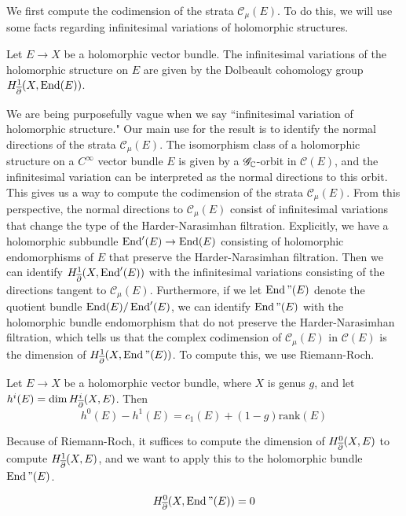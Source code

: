 We first compute the codimension of the strata $\mathscr{C}_\mu(E)$. To do
this, we will use some facts regarding infinitesimal variations of holomorphic
structures.
%
\begin{prop}
Let $E \to X$ be a holomorphic vector bundle. The infinitesimal variations
of the holomorphic structure on $E$ are given by the Dolbeault cohomology group
$H^1_{\overline{\partial}}(X, \operatorname{End}(E))$.
\end{prop}
%
We are being purposefully vague when we say ``infinitesimal variation of holomorphic
structure." Our main use for the result is to identify the normal directions
of the strata $\mathscr{C}_\mu(E)$. The isomorphism class of a holomorphic
structure on a $C^\infty$ vector bundle $E$ is given by a $\mathscr{G}_{\mathbb{C}}$-orbit
in $\mathscr{C}(E)$, and the infinitesimal variation can be interpreted as the
normal directions to this orbit. This gives us a way to compute the
codimension of the strata $\mathscr{C}_\mu(E)$. From this perspective,
the normal directions to $\mathscr{C}_\mu(E)$ consist of infinitesimal variations
that change the type of the Harder-Narasimhan filtration. Explicitly,
we have a holomorphic subbundle $\operatorname{End}'(E) \to \operatorname{End}(E)$ consisting of
holomorphic endomorphisms of $E$ that preserve the Harder-Narasimhan filtration.
Then we can identify $H^1_{\overline{\partial}}(X,\operatorname{End}'(E))$ with the infinitesimal variations
consisting of the directions tangent to $\mathscr{C}_\mu(E)$. Furthermore, if
we let $\operatorname{End}"(E)$ denote the quotient bundle $\operatorname{End}(E)/\operatorname{End}'(E)$,
we can identify $\operatorname{End}"(E)$ with the holomorphic bundle endomorphism that do
not preserve the Harder-Narasimhan filtration, which tells us that the complex
codimension of $\mathscr{C}_\mu(E)$ in $\mathscr{C}(E)$ is the dimension of
$H^1_{\overline{\partial}}(X,\operatorname{End}"(E))$. To compute this, we use Riemann-Roch.
%
\begin{thm}
Let $E \to X$ be a holomorphic vector bundle, where $X$ is genus $g$, and let
$h^i(E) = \dim H^i_{\overline{\partial}}(X,E)$. Then
\[
h^0(E) - h^1(E) = c_1(E) + (1-g)\mathrm{rank}(E)
\]
\end{thm}
%
Because of Riemann-Roch, it suffices to compute the dimension of
$H^0_{\overline{\partial}}(X,E)$ to compute $H^1_{\overline{\partial}}(X,E)$, and we want to apply
this to the holomorphic bundle $\operatorname{End}"(E)$.
%
\begin{prop}
\[
H^0_{\overline{\partial}}(X,\operatorname{End}"(E)) = 0
\]
\end{prop}
%
